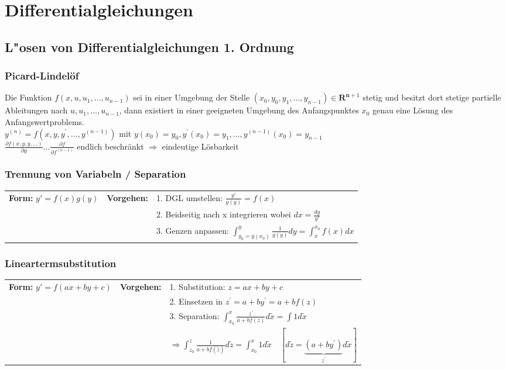 \section{Differentialgleichungen }

\subsection{L"osen von Differentialgleichungen 1. Ordnung}

\subsubsection{Picard-Lindelöf}
Die Funktion $f\left(x, u, u_{1}, \ldots, u_{n-1}\right)$ sei in einer Umgebung der Stelle $\left(x_{0}, y_{0}, y_{1}, \ldots, y_{n-1}\right) \in \mathbf{R}^{\mathbf{n}+1}$ stetig und besitzt dort stetige partielle Ableitungen nach $u, u_{1}, \ldots, u_{n-1}$, dann existiert in einer geeigneten Umgebung des Anfangspunktes $x_{0}$ genau eine Lösung des Anfangswertproblems.\\
$y^{(n)}=f\left(x, y, y^{\prime}, \ldots, y^{(n-1)}\right)$ mit $y\left(x_{0}\right)=y_{0}, y^{\prime}\left(x_{0}\right)=y_{1}, \ldots, y^{(n-1)}\left(x_{0}\right)=y_{n-1}$\\
\newline
$\frac{\partial f(x,y,y,...)}{\partial y} \ldots \frac{\partial f}{\partial f^{(n-1)}}$ endlich beschränkt $\Rightarrow$ eindeutige Lösbarkeit

\subsubsection{Trennung von Variabeln / Separation }
\begin{tabular}{p{4cm}p{1.5cm}p{10.5cm}}
\textbf{Form:} $y' = f(x) g(y)$ &
\textbf{Vorgehen:}              &
1. DGL umstellen: $\frac{y'}{g(y)} = f(x)$ \\ &&
2. Beidseitig nach x integrieren wobei $dx = \frac{dy}{y'}$ \\ &&
3. Genzen anpassen: $\int_{y_0=y(x_0)}^{y} \frac{1}{g(y)} dy =
\int_{x}^{x_0}f(x) dx$
\end{tabular}

\subsubsection{Lineartermsubstitution }
\begin{tabular}{p{4cm}p{1.5cm}p{10.5cm}}
\textbf{Form:} $y'=f(ax+by+c)$   &
\textbf{Vorgehen:}               &
1. Substitution: $z=ax+by+c$ \\ &&
2. Einsetzen in $z^{\prime}=a+b y^{\prime}=a+b f(z)$\\ &&
3. Separation: $\int_{x_{0}}^{x} \frac{z^{\prime}}{a+b f(z)} d \tilde{x}=\int 1 d \tilde{x}$\\ &&
 $\Rightarrow \int_{z_{0}}^{z} \frac{1}{a+b f(\tilde{z})} d \tilde{z}=\int_{x_{0}}^{x} 1 d \tilde{x} \quad\left[d \tilde{z}=\underbrace{\left(a+b y^{\prime}\right)}_{z^{\prime}} d \tilde{x}\right]$
\end{tabular}

